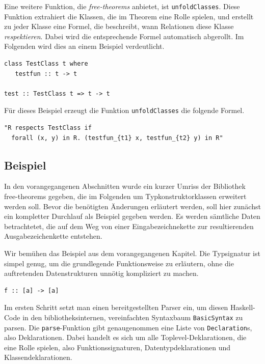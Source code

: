 Eine weitere Funktion, die \textit{free-theorems} anbietet, ist \texttt{unfoldClasses}. Diese Funktion extrahiert die Klassen,
die im Theorem eine Rolle spielen, und erstellt zu jeder Klasse eine Formel, die beschreibt, wann Relationen diese Klasse
\textit{respektieren}. Dabei wird die entsprechende Formel automatisch abgerollt. Im Folgenden wird dies an einem Beispiel
verdeutlicht.

\begin{verbatim}
class TestClass t where
   testfun :: t -> t

test :: TestClass t => t -> t
\end{verbatim}

Für dieses Beispiel erzeugt die Funktion \texttt{unfoldClasses} die folgende Formel.

\begin{verbatim}
"R respects TestClass if
  forall (x, y) in R. (testfun_{t1} x, testfun_{t2} y) in R"
\end{verbatim}

\subsection{Beispiel}

In den vorangegangenen Abschnitten wurde ein kurzer Umriss der Bibliothek free-theorems gegeben, die im Folgenden um
Typkonstruktorklassen erweitert werden soll. Bevor die benötigten Änderungen erläutert werden, soll hier zunächst ein
kompletter Durchlauf als Beispiel gegeben werden. Es werden sämtliche Daten betrachtetet, die auf dem Weg von einer
Eingabezeichnekette zur resultierenden Ausgabezeichenkette entstehen.


Wir bemühen das Beispiel aus dem vorangegangenen Kapitel. Die Typsignatur ist simpel genug,
um die grundlegende Funktionsweise zu erläutern, ohne die auftretenden Datenstrukturen unnötig kompliziert zu machen.

\begin{verbatim}
f :: [a] -> [a]
\end{verbatim}

Im ersten Schritt setzt man einen bereitgestellten Parser ein, um diesen Haskell-Code in den bibliotheksinternen, vereinfachten
Syntaxbaum \texttt{BasicSyntax} zu parsen. Die \texttt{parse}-Funktion gibt genaugenommen eine Liste von \texttt{Declaration}s, also Deklarationen. Dabei handelt es sich um alle Toplevel-Deklarationen, die eine Rolle spielen, also Funktionssignaturen,
Datentypdeklarationen und Klassendeklarationen.

